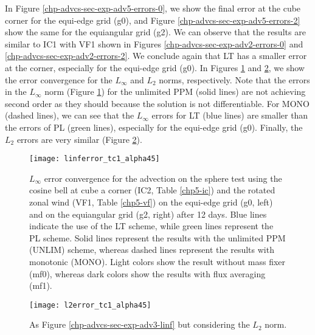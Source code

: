 In Figure \ref{chp-advcs-sec-exp-adv5-errors-0}, we show the final error at the cube corner for the equi-edge grid (g0), 
and Figure \ref{chp-advcs-sec-exp-adv5-errors-2} show the same for the equiangular grid (g2).
We can observe that the results are similar to IC1 with VF1 shown in Figures \ref{chp-advcs-sec-exp-adv2-errors-0} and \ref{chp-advcs-sec-exp-adv2-errors-2}.
We conclude again that LT has a smaller error at the corner, especially for the equi-edge grid (g0).
\newpage
In Figures \ref{chp-advcs-sec-exp-adv5-linf} and \ref{chp-advcs-sec-exp-adv5-l2},
we show the error convergence for the $L_{\infty}$ and $L_2$ norms, respectively.
Note that the errors in the $L_{\infty}$ norm (Figure \ref{chp-advcs-sec-exp-adv5-linf})
for the unlimited PPM (solid lines) are not achieving second order as they should because the solution is not differentiable.
For MONO (dashed lines), we can see that the $L_{\infty}$ errors for LT (blue lines) are smaller than the errors of PL (green lines), 
especially for the equi-edge grid (g0).
Finally, the $L_2$ errors are very similar (Figure \ref{chp-advcs-sec-exp-adv5-l2}).
\begin{figure}[!htb]
	\centering
	\texttt{[image: linferror\_tc1\_alpha45]}
	\caption{
		$L_{\infty}$ error convergence for the advection on the sphere test using the cosine bell at cube a corner (IC2, Table \ref{chp5-ic}) and 
		the rotated zonal wind  (VF1, Table \ref{chp5-vf}) on the equi-edge grid (g0, left) 
		and on the equiangular grid (g2, right) after 12 days.
		Blue lines indicate the use of the LT scheme, while green lines represent the PL scheme.
		Solid lines represent the results with the unlimited PPM (UNLIM) scheme, whereas dashed lines represent the results with monotonic (MONO).
		Light colors show the result without mass fixer (mf0), whereas dark colors show the results with flux averaging (mf1).
		\label{chp-advcs-sec-exp-adv5-linf}}
\end{figure}

\begin{figure}[!htb]
	\centering
	\texttt{[image: l2error\_tc1\_alpha45]}
	\caption{As Figure \ref{chp-advcs-sec-exp-adv3-linf} but considering the $L_2$ norm. \label{chp-advcs-sec-exp-adv5-l2}}
\end{figure}

